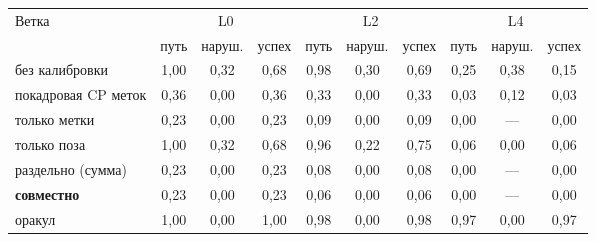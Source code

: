 \begin{tabular}{lccccccccc}
\toprule
Ветка & \multicolumn{3}{c}{L0} & \multicolumn{3}{c}{L2} & \multicolumn{3}{c}{L4} \\
 & путь & наруш. & успех & путь & наруш. & успех & путь & наруш. & успех \\
\midrule
без калибровки & 1{,}00 & 0{,}32 & 0{,}68 & 0{,}98 & 0{,}30 & 0{,}69 & 0{,}25 & 0{,}38 & 0{,}15 \\
покадровая CP меток & 0{,}36 & 0{,}00 & 0{,}36 & 0{,}33 & 0{,}00 & 0{,}33 & 0{,}03 & 0{,}12 & 0{,}03 \\
только метки & 0{,}23 & 0{,}00 & 0{,}23 & 0{,}09 & 0{,}00 & 0{,}09 & 0{,}00 & --- & 0{,}00 \\
только поза & 1{,}00 & 0{,}32 & 0{,}68 & 0{,}96 & 0{,}22 & 0{,}75 & 0{,}06 & 0{,}00 & 0{,}06 \\
раздельно (сумма) & 0{,}23 & 0{,}00 & 0{,}23 & 0{,}08 & 0{,}00 & 0{,}08 & 0{,}00 & --- & 0{,}00 \\
\textbf{совместно} & 0{,}23 & 0{,}00 & 0{,}23 & 0{,}06 & 0{,}00 & 0{,}06 & 0{,}00 & --- & 0{,}00 \\
оракул & 1{,}00 & 0{,}00 & 1{,}00 & 0{,}98 & 0{,}00 & 0{,}98 & 0{,}97 & 0{,}00 & 0{,}97 \\
\bottomrule
\end{tabular}
